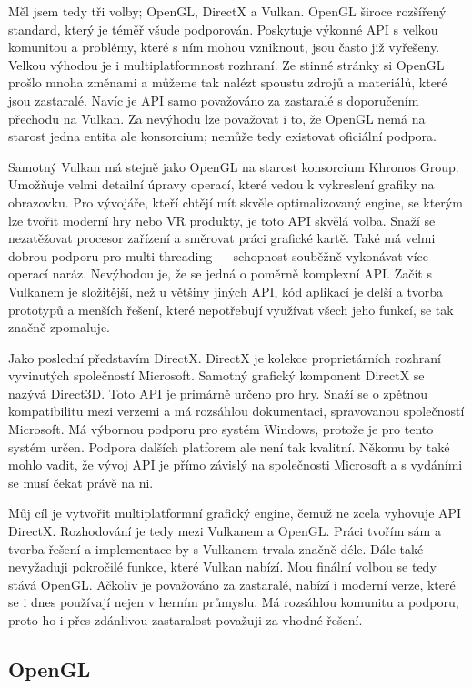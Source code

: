\documentclass[12pt]{article}
\begin{document}
Měl jsem tedy tři volby; OpenGL, DirectX a Vulkan. OpenGL široce rozšířený standard, který je téměř všude podporován. Poskytuje výkonné API s velkou komunitou a problémy, které s ním mohou vzniknout, jsou často již vyřešeny. Velkou výhodou je i multiplatformnost rozhraní. Ze stinné stránky si OpenGL prošlo mnoha změnami a můžeme tak nalézt spoustu zdrojů a materiálů, které jsou zastaralé. Navíc je API samo považováno za zastaralé s doporučením přechodu na Vulkan. Za nevýhodu lze považovat i to, že OpenGL nemá na starost jedna entita ale konsorcium; nemůže tedy existovat oficiální podpora.

Samotný Vulkan má stejně jako OpenGL na starost konsorcium Khronos Group. Umožňuje velmi detailní úpravy operací, které vedou k vykreslení grafiky na obrazovku. Pro vývojáře, kteří chtějí mít skvěle optimalizovaný engine, se kterým lze tvořit moderní hry nebo VR produkty, je toto API skvělá volba. Snaží se nezatěžovat procesor zařízení a směrovat práci grafické kartě. Také má velmi dobrou podporu pro multi-threading — schopnost souběžně vykonávat více operací naráz. Nevýhodou je, že se jedná o poměrně komplexní API. Začít s Vulkanem je složitější, než u většiny jiných API, kód aplikací je delší a tvorba prototypů a menších řešení, které nepotřebují využívat všech jeho funkcí, se tak značně zpomaluje.

Jako poslední představím DirectX. DirectX je kolekce proprietárních rozhraní vyvinutých společností Microsoft. Samotný grafický komponent DirectX se nazývá Direct3D. Toto API je primárně určeno pro hry. Snaží se o zpětnou kompatibilitu mezi verzemi a má rozsáhlou dokumentaci, spravovanou společností Microsoft. Má výbornou podporu pro systém Windows, protože je pro tento systém určen. Podpora dalších platforem ale není tak kvalitní. Někomu by také mohlo vadit, že vývoj API je přímo závislý na společnosti Microsoft a s vydáními se musí čekat právě na ni.

Můj cíl je vytvořit multiplatformní grafický engine, čemuž ne zcela vyhovuje API DirectX. Rozhodování je tedy mezi Vulkanem a OpenGL. Práci tvořím sám a tvorba řešení a implementace by s Vulkanem trvala značně déle. Dále také nevyžaduji pokročilé funkce, které Vulkan nabízí. Mou finální volbou se tedy stává OpenGL. Ačkoliv je považováno za zastaralé, nabízí i moderní verze, které se i dnes používají nejen v herním průmyslu. Má rozsáhlou komunitu a podporu, proto ho i přes zdánlivou zastaralost považuji za vhodné řešení.

\subsection{OpenGL}
\end{document}
